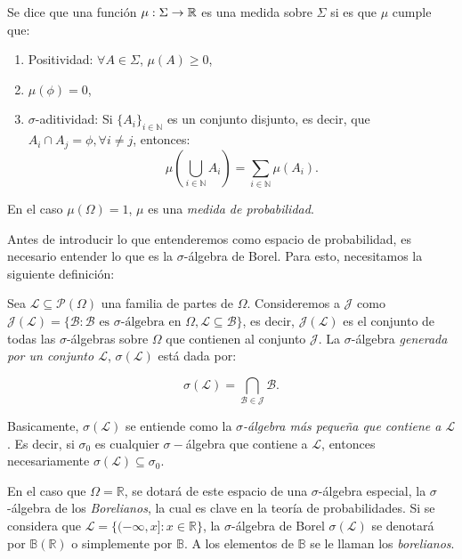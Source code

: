\begin{definition}[Medida]
Se dice que una función $\mu:\Sigma\rightarrow{\mathbb R}$ es una medida sobre $\Sigma$ si es que $\mu$ cumple que:

\begin{enumerate}
    \item Positividad: $\forall A \in\Sigma$, $\mu(A)\geq 0$,
    \item $\mu(\phi)=0$,
    \item $\sigma$-aditividad: Si $\{A_i\}_{i\in\mathbb{N}}$ es un conjunto disjunto, es decir, que $A_i\cap A_j=\phi, \forall i\neq j$, entonces:
    \[\mu\left( \bigcup\limits_{i\in\mathbb{N}}A_i \right)=\sum_{i\in\mathbb{N}}\mu(A_i).\]
    
\end{enumerate}
En el caso $\mu(\Omega)=1$, $\mu$ es una \emph{medida de probabilidad}.
\end{definition}

Antes de introducir lo que entenderemos como espacio de probabilidad, es necesario entender lo que es la $\sigma$-álgebra de Borel. Para esto, necesitamos la siguiente definición:

\begin{definition}
Sea $\mathcal{L}\subseteq\mathcal{P}(\Omega)$ una familia de partes de $\Omega$. Consideremos a $\mathcal{J}$ como $\mathcal{J}(\mathcal{L})=\{\mathcal{B}:\mathcal{B}\text{ es $\sigma$-álgebra en }\Omega, \mathcal{L}\subseteq\mathcal{B}\}$, es decir, $\mathcal{J}(\mathcal{L})$ es el conjunto de todas las $\sigma$-álgebras sobre $\Omega$ que contienen al conjunto $\mathcal{J}$. La $\sigma$-álgebra \emph{generada por un conjunto $\mathcal{L}$}, $\sigma(\mathcal{L})$ está dada por:

\[\sigma(\mathcal{L})=\bigcap\limits_{\mathcal{B}\in\mathcal{J}}\mathcal{B}.\]
\end{definition}

 Basicamente, $\sigma(\mathcal{L})$ se entiende como la \emph{$\sigma$-álgebra más pequeña que contiene a $\mathcal{L}$}. Es decir, si $\sigma_0$ es cualquier $\sigma-$álgebra que contiene a $\mathcal{L}$, entonces necesariamente $\sigma(\mathcal{L})\subseteq\sigma_0$. 

En el caso que $\Omega=\mathbb{R}$, se dotará de este espacio de una $\sigma$-álgebra especial, la $\sigma$-álgebra de los \emph{Borelianos}, la cual es clave en la teoría de probabilidades. Si se considera que $\mathcal{L}=\{(-\infty, x]:x\in\mathbb{\mathbb{R}}\}$, la $\sigma$-álgebra de Borel  $\sigma(\mathcal{L})$ se denotará por $\mathbb{B}(\mathbb{R})$ o simplemente por $\mathbb{B}$. A los elementos de $\mathbb{B}$ se le llaman los \emph{borelianos}.

